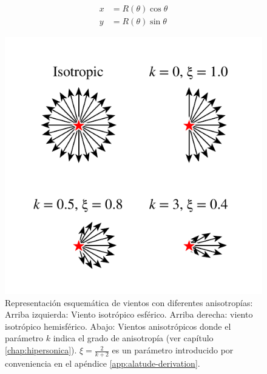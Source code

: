\begin{align}
  x &= R(\theta)\cos\theta \label{eq:polar-to-x}\\
  y &= R(\theta)\sin\theta \label{eq:polar-to-y}
\end{align}

\begin{figure}
  \centering
  \includegraphics[width=0.5\linewidth]{./Figures/anisotropic-arrows}
  \caption[Representación esquemática de vientos con diferentes anisotropías]{Representación esquemática de vientos con diferentes anisotropías: Arriba izquierda: Viento isotrópico esférico. Arriba derecha: viento isotrópico hemisférico. Abajo: Vientos anisotrópicos donde el parámetro $k$ indica el grado de anisotropía (ver capítulo \ref{chap:hipersonica}). $\xi = \frac{2}{k+2}$ es un parámetro introducido por conveniencia en el apéndice \ref{app:alatude-derivation}.}
    \label{fig:isotropic-aniso}
\end{figure}
